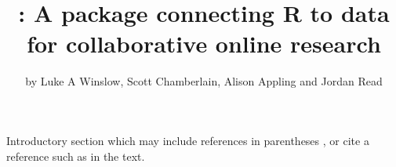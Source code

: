\title{: A package connecting R to data for collaborative online research}
\author{by Luke A Winslow, Scott Chamberlain, Alison Appling and Jordan Read}

\maketitle


Introductory section which may include references in parentheses
\citep{R}, or cite a reference such as \citet{R} in the text.












\address{Luke A Winslow\\
  U.S. Geological Survey Center for Integrated Data Analytics\\
  Middleton, Wisconsin\\
  USA\\}

\address{Scott Chamberlain\\
  Affiliation\\
  Address\\
  Country\\}

\address{Alison Appling\\
  Affiliation\\
  Address\\
  Country\\}

\address{Jordan S Read\\
  U.S. Geological Survey Center for Integrated Data Analytics\\
  Middleton, Wisconsin\\
  USA\\}



